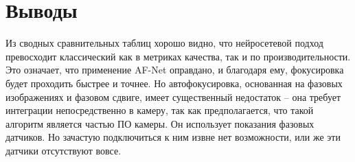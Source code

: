 \section{Выводы} \label{ch1:conclusion}

Из сводных сравнительных таблиц хорошо видно, что нейросетевой подход превосходит классический как в метриках качества, так и по производительности. Это означает, что применение AF-Net оправдано, и благодаря ему, фокусировка будет проходить быстрее и точнее. Но автофокусировка, основанная на фазовых изображениях и фазовом сдвиге, имеет существенный недостаток -- она требует интеграции непосредственно в камеру, так как предполагается, что такой алгоритм является частью ПО камеры. Он использует показания фазовых датчиков. Но зачастую подключиться к ним извне нет возможности, или же эти датчики отсутствуют вовсе.